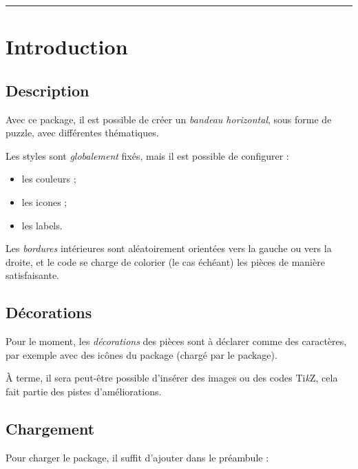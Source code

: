 \documentclass[11pt,a4paper]{ltxdoc}
\providecommand\tikzlogo{Ti\textit{k}Z}
\let\TikZ\tikzlogo
\begin{document}

\hypertarget{matoc}{}

\tableofcontents

\vspace*{5mm}

\hrule

\vspace*{5mm}

\section{Introduction}

\subsection{Description}

Avec ce package, il est possible de créer un \textit{bandeau horizontal}, sous forme de puzzle, avec différentes thématiques.

Les styles sont \textit{globalement} fixés, mais il est possible de configurer :

\begin{itemize}
	\item les couleurs ;
	\item les icones ;
	\item les labels.
\end{itemize}

Les \textit{bordures} intérieures sont aléatoirement orientées vers la gauche ou vers la droite, et le code se charge de colorier (le cas échéant) les pièces de manière satisfaisante.

\subsection{Décorations}

Pour le moment, les \textit{décorations} des pièces sont à déclarer comme des caractères, par exemple avec des icônes du package  (chargé par le package).

\smallskip

À terme, il sera peut-être possible d'insérer des images ou des codes \TikZ, cela fait partie des pistes d'améliorations.

\subsection{Chargement}

Pour charger le package, il suffit d'ajouter dans le préambule :
\end{document}
